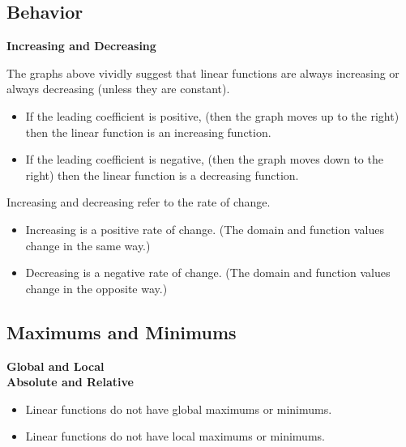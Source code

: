 \documentclass{ximera}
\begin{document}
\subsection*{Behavior}



\textbf{\textcolor{blue!55!black}{Increasing and Decreasing}}






The graphs above vividly suggest that linear functions are always increasing or always decreasing (unless they are constant).


\begin{itemize}
\item If the leading coefficient is positive, (then the graph moves up to the right) then the linear function is an increasing function.

\item If the leading coefficient is negative, (then the graph moves down to the right) then the linear function is a decreasing function.
\end{itemize}





Increasing and decreasing refer to the rate of change.


\begin{itemize}
\item Increasing is a positive rate of change. (The domain and function values change in the same way.)
\item Decreasing is a negative rate of change. (The domain and function values change in the opposite way.)
\end{itemize}
















\subsection*{Maximums and Minimums}

\textbf{\textcolor{blue!55!black}{Global and Local}} \\
\textbf{\textcolor{blue!55!black}{Absolute and Relative}} 


\begin{itemize}
     \item Linear functions do not have global maximums or minimums. 
     \item Linear functions do not have local maximums or minimums. 
\end{itemize}
\end{document}
